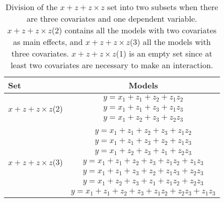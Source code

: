 \begin{table}
\centering
\caption{Division of the $x + z + z \times z$ set into two subsets when there are three covariates and one dependent variable. $x + z + z \times z$(2) contains all the models with two covariates as main effects, and $x + z + z \times z$(3) all the models with three covariates. $x + z + z \times z$(1) is an empty set since at least two covariates are necessary to make an interaction.}
\label{tab:model4}
\begin{tabular}{lc} 
\toprule
Set & Models \\ 
\midrule
\multirow{3}{*}{$x + z + z \times z$(2)} & $y=x_1+z_1+z_2+z_1z_2$\\ & $y=x_1+z_1+z_3+z_1z_3$\\ & $y=x_1+z_2+z_3+z_2z_3$\\ &  \\  
\multirow{7}{*}{$x + z + z \times z$(3)} & $y=x_1+z_1+z_2+z_3+z_1z_2$\\ & $y=x_1+z_1+z_3+z_2+z_1z_3$\\ & $y=x_1+z_2+z_3+z_1+z_2z_3$\\ & $y=x_1+z_1+z_2+z_3+z_1z_2+z_1z_3$\\ & $y=x_1+z_1+z_3+z_2+z_1z_3+z_2z_3$\\ & $y=x_1+z_2+z_3+z_1+z_1z_2+z_2z_3$\\ & $y=x_1+z_1+z_2+z_3+z_1z_2+z_2z_3+z_1z_3$\\ 
\bottomrule
\end{tabular}
\end{table}

